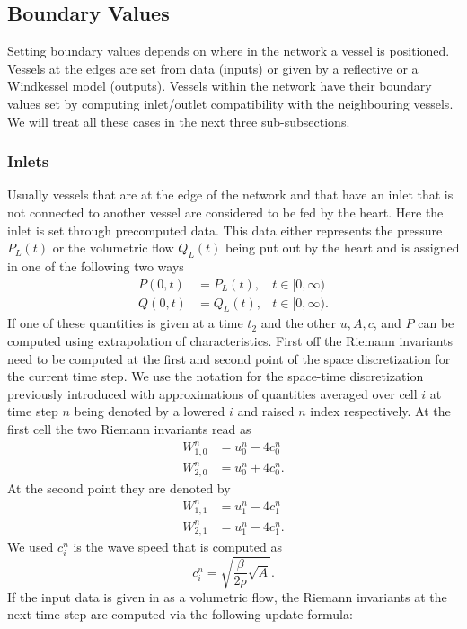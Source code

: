 \documentclass[a4paper, oneside]{discothesis}
\begin{document}
	\subsection{Boundary Values} \label{ssec:boundary_values}
	Setting boundary values depends on where in the network a vessel is positioned.
	Vessels at the edges are set from data (inputs) or given by a reflective or a Windkessel model (outputs).
	Vessels within the network have their boundary values set by computing inlet/outlet compatibility with the neighbouring vessels.
	We will treat all these cases in the next three sub-subsections.

	\subsubsection{Inlets}\label{sssec:inlets}
	Usually vessels that are at the edge of the network and that have an inlet that is not connected to another vessel are considered to be fed by the heart.
	Here the inlet is set through precomputed data.
	This data either represents the pressure $P_L(t)$ or the volumetric flow $Q_L(t)$ being put out by the heart and is assigned in one of the following two ways
	\begin{align}
		P(0,t) &= P_L(t), &t \in [0,\infty) \\
		Q(0,t) &= Q_L(t), &t \in [0,\infty).
	\end{align}
	If one of these quantities is given at a time $t_2$ and the other $u, A, c$, and $P$ can be computed using extrapolation of characteristics.
	First off the Riemann invariants need to be computed at the first and second point of the space discretization for the current time step.
	We use the notation for the space-time discretization previously introduced with approximations of quantities averaged over cell $i$ at time step $n$ being denoted by a lowered $i$ and raised $n$ index respectively.
	At the first cell the two Riemann invariants read as
	\begin{align}
		W_{1,0}^n &= u^n_0 - 4c^n_0\\
		W_{2,0}^n &= u^n_0 + 4c^n_0.
	\end{align}
	At the second point they are denoted by
	\begin{align}
		W_{1,1}^n &= u^n_1 - 4c^n_1\\
		W_{2,1}^n &= u^n_1 - 4c^n_1.
	\end{align}
	We used $c_i^n$ is the wave speed that is computed as
	\begin{equation}
		c^n_i = \sqrt{\frac{\beta}{2\rho}\sqrt{A}}.
	\end{equation}
	If the input data is given in as a volumetric flow, the Riemann invariants at the next time step are computed via the following update formula:
\end{document}
